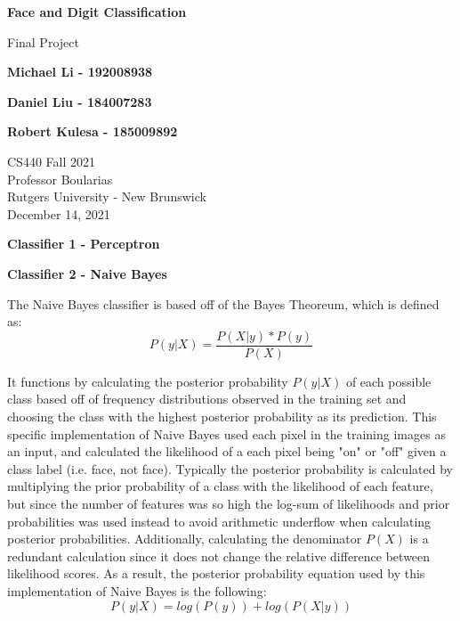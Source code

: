 \documentclass[11pt]{article}
\begin{document}
    \begin{titlepage}
        \begin{center}
            \vspace{1cm}

            \Huge
            \textbf{Face and Digit Classification}

            \vspace{0.5cm}
            \LARGE
            Final Project

            \vspace{1cm}

            \textbf{Michael Li - 192008938}

            \textbf{Daniel Liu - 184007283}

            \textbf{Robert Kulesa - 185009892}


            \vfill


            \vspace{0.8cm}

            \Large
            CS440 Fall 2021\\
            Professor Boularias\\
            Rutgers University - New Brunswick\\
            December 14, 2021

        \end{center}
    \end{titlepage}

    \begin{center}
        \Large
        \textbf{Classifier 1 - Perceptron}
    \end{center}
    \normalsize

    \begin{center}
        \Large
        \textbf{Classifier 2 - Naive Bayes}
    \end{center}
    \normalsize
    The Naive Bayes classifier is based off of the Bayes Theoreum, which is defined as:\\
    
    \[P(y|X) = \frac{P(X|y)*P(y)}{P(X)}\]
    
    It functions by calculating the posterior probability $P(y|X)$ of each possible class based off of frequency distributions observed in the training set and choosing the class with the highest posterior probability as its prediction. This specific implementation of Naive Bayes used each pixel in the training images as an input, and calculated the likelihood of a each pixel being "on" or "off" given a class label (i.e. face, not face). Typically the posterior probability is calculated by multiplying the prior probability of a class  with the likelihood of each feature, but since the number of features was so high the log-sum of likelihoods and prior probabilities was used instead to avoid arithmetic underflow when calculating posterior probabilities. Additionally, calculating the denominator $P(X)$ is a redundant calculation since it does not change the relative difference between likelihood scores. As a result, the posterior probability equation used by this implementation of Naive Bayes is the following:\\ 
    \[P(y|X) = log(P(y)) + log(P(X|y))\]
    
\end{document}
